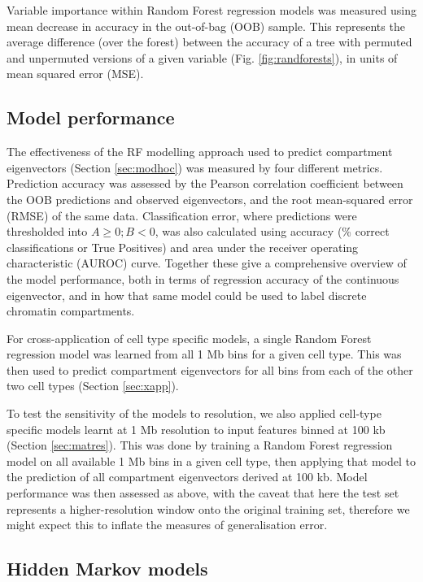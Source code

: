 \documentclass[a4paper,11pt,oneside]{book}
\begin{document}
Variable importance within Random Forest regression models was measured
using mean decrease in accuracy in the out-of-bag (OOB) sample. This
represents the average difference (over the forest) between the accuracy
of a tree with permuted and unpermuted versions of a given variable (Fig. \ref{fig:randforests}), in
units of mean squared error (MSE).\citep{Cutler2007, Dasgupta2012}

\subsection{Model performance}\label{sec:modelperf}

The effectiveness of the RF modelling approach used to predict compartment eigenvectors (Section \ref{sec:modhoc}) was measured by four
different metrics. Prediction accuracy was assessed by the Pearson
correlation coefficient between the OOB predictions and observed eigenvectors, and the root mean-squared
error (RMSE) of the same data. Classification error, where predictions
were thresholded into $A \geq 0; B < 0$, was also calculated using
accuracy (\% correct classifications or True Positives) and area under
the receiver operating characteristic (AUROC) curve. Together these give
a comprehensive overview of the model performance, both in terms of
regression accuracy of the continuous eigenvector, and in how that same
model could be used to label discrete chromatin compartments.

For cross-application of cell type specific models, a single Random
Forest regression model was learned from all 1 Mb bins for a given cell
type. This was then used to predict compartment eigenvectors for all bins from each of the other two
cell types (Section \ref{sec:xapp}).

To test the sensitivity of the models to resolution, we also applied cell-type specific models learnt at 1 Mb resolution to input features binned at 100 kb (Section \ref{sec:matres}). This was done by training a Random Forest regression model on all available 1 Mb bins in a given cell type, then applying that model to the prediction of all compartment eigenvectors derived at 100 kb. Model performance was then assessed as above, with the caveat that here the test set represents a higher-resolution window onto the original training set, therefore we might expect this to inflate the measures of generalisation error.

\subsection{Hidden Markov models}\label{meth:hmm}
\end{document}
